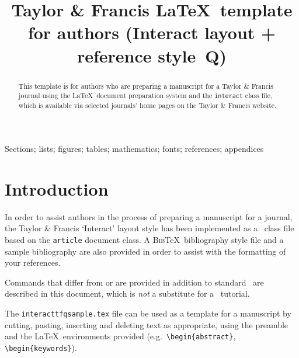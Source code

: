 \documentclass[]{interact}
\theoremstyle{plain}%
\theoremstyle{definition}
\theoremstyle{remark}
\begin{document}

\title{Taylor \& Francis \LaTeX\ template for authors (\textsf{Interact} layout + reference style~Q)}

\author{
}

\maketitle

\begin{abstract}
This template is for authors who are preparing a manuscript for a Taylor \& Francis journal using the \LaTeX\ document preparation system and the \texttt{interact} class file, which is available via selected journals' home pages on the Taylor \& Francis website.
\end{abstract}

\begin{keywords}
Sections; lists; figures; tables; mathematics; fonts; references; appendices
\end{keywords}


\section{Introduction}

In order to assist authors in the process of preparing a manuscript for a journal, the Taylor \& Francis `\textsf{Interact}' layout style has been implemented as a \LaTeXe\ class file based on the \texttt{article} document class. A \textsc{Bib}\TeX\ bibliography style file and a sample bibliography are also provided in order to assist with the formatting of your references.

Commands that differ from or are provided in addition to standard \LaTeXe\ are described in this document, which is \emph{not} a substitute for a \LaTeXe\ tutorial.

The \texttt{interacttfqsample.tex} file can be used as a template for a manuscript by cutting, pasting, inserting and deleting text as appropriate, using the preamble and the \LaTeX\ environments provided (e.g.\ \verb"\begin{abstract}", \verb"\begin{keywords}").
\end{document}
